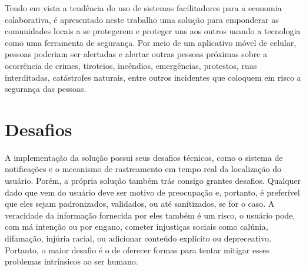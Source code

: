 Tendo em vista a tendência do uso de sistemas facilitadores para a economia colaborativa, é apresentado neste trabalho uma solução para emponderar as comunidades locais a se protegerem e proteger uns aos outros usando a tecnologia como uma ferramenta de segurança. Por meio de um aplicativo móvel de celular, pessoas poderiam ser alertadas e alertar outras pessoas próximas sobre a ocorrência de crimes, tiroteios, incêndios, emergências, protestos, ruas interditadas, catástrofes naturais, entre outros incidentes que coloquem em risco a segurança das pessoas.

\section{Desafios}

A implementação da solução possui seus desafios técnicos, como o sistema de notificações e o mecanismo de rastreamento em tempo real da localização do usuário. Porém, a própria solução também trás consigo grantes desafios. Qualquer dado que vem do usuário deve ser motivo de preocupação e, portanto, é preferível que eles sejam padronizados, validados, ou até sanitizados, se for o caso. A veracidade da informação fornecida por eles também é um risco, o usuário pode, com má intenção ou por engano, cometer injustiças sociais como calúnia, difamação, injúria racial, ou adicionar conteúdo explícito ou depreceativo. Portanto, o maior desafio é o de oferecer formas para tentar mitigar esses problemas intrínsicos ao ser humano.

